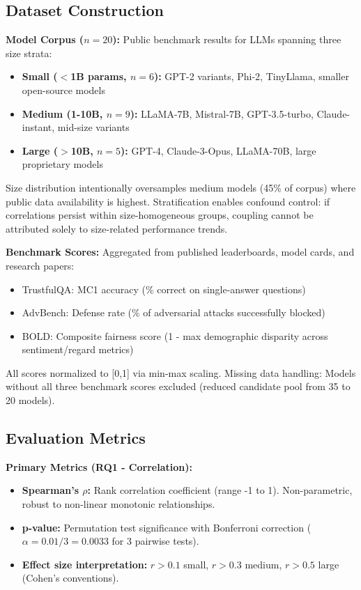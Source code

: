 \subsection{Dataset Construction}

\textbf{Model Corpus ($n=20$):} Public benchmark results for LLMs spanning three size strata:
\begin{itemize}
\item \textbf{Small ($<$1B params, $n=6$):} GPT-2 variants, Phi-2, TinyLlama, smaller open-source models
\item \textbf{Medium (1-10B, $n=9$):} LLaMA-7B, Mistral-7B, GPT-3.5-turbo, Claude-instant, mid-size variants
\item \textbf{Large ($>$10B, $n=5$):} GPT-4, Claude-3-Opus, LLaMA-70B, large proprietary models
\end{itemize}

Size distribution intentionally oversamples medium models (45\% of corpus) where public data availability is highest. Stratification enables confound control: if correlations persist within size-homogeneous groups, coupling cannot be attributed solely to size-related performance trends.

\textbf{Benchmark Scores:} Aggregated from published leaderboards, model cards, and research papers:
\begin{itemize}
\item TrustfulQA: MC1 accuracy (\% correct on single-answer questions)
\item AdvBench: Defense rate (\% of adversarial attacks successfully blocked)
\item BOLD: Composite fairness score (1 - max demographic disparity across sentiment/regard metrics)
\end{itemize}

All scores normalized to [0,1] via min-max scaling. Missing data handling: Models without all three benchmark scores excluded (reduced candidate pool from 35 to 20 models).

\subsection{Evaluation Metrics}

\textbf{Primary Metrics (RQ1 - Correlation):}
\begin{itemize}
\item \textbf{Spearman's $\rho$:} Rank correlation coefficient (range -1 to 1). Non-parametric, robust to non-linear monotonic relationships.
\item \textbf{p-value:} Permutation test significance with Bonferroni correction ($\alpha = 0.01 / 3 = 0.0033$ for 3 pairwise tests).
\item \textbf{Effect size interpretation:} $r > 0.1$ small, $r > 0.3$ medium, $r > 0.5$ large (Cohen's conventions).
\end{itemize}

